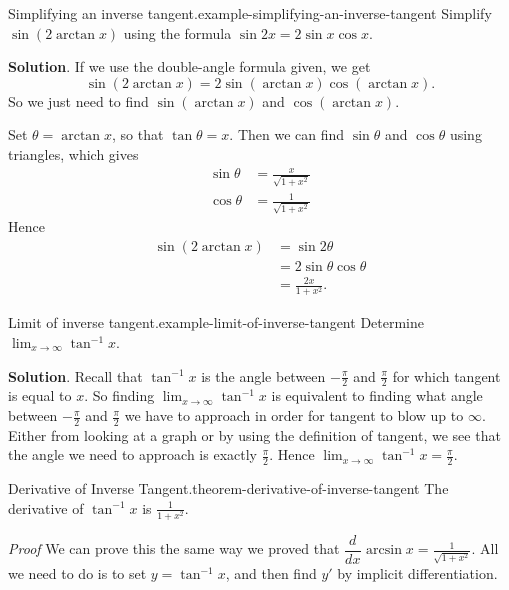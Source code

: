 \documentclass[10pt,]{book}
\makeatletter
\renewcommand*{\proofname}{Proof}
\renewenvironment{proof}[1][\proofname]{\par
  \pushQED{\qed}%
  \normalfont \topsep6\p@\@plus6\p@\relax
  \trivlist
  \item\relax
    {\itshape
    #1\@addpunct{.}}\hspace\labelsep\ignorespaces
}{%
  \popQED\endtrivlist\@endpefalse
}
\numberwithin{equation}{section}
\newcommand{\dv}[3][]{\dfrac{d^{#1} #2}{d #3^{#1}}}
\makeatother
\begin{document}
\begin{example}{Simplifying an inverse tangent.}{example-simplifying-an-inverse-tangent}%
\hypertarget{p-273}{}%
Simplify \(\sin(2\arctan x)\) using the formula \(\sin2x = 2\sin x\cos x\).%
\par\smallskip%
\noindent\textbf{Solution}.\hypertarget{solution-59}{}\quad%
\hypertarget{p-274}{}%
If we use the double-angle formula given, we get%
\begin{equation*}
\sin(2\arctan x) = 2\sin(\arctan x)\cos(\arctan x).
\end{equation*}
So we just need to find \(\sin(\arctan x)\) and \(\cos(\arctan x)\).%
\par
\hypertarget{p-275}{}%
Set \(\theta = \arctan x\), so that \(\tan\theta = x\). Then we can find \(\sin\theta\) and \(\cos\theta\) using triangles, which gives%
\begin{align*}
\sin\theta & = \frac{x}{\sqrt{1+x^{2}}} \\
\cos\theta & = \frac{1}{\sqrt{1+x^{2}}} 
\end{align*}
Hence%
\begin{align*}
\sin(2\arctan x) & = \sin2\theta \\
& = 2\sin\theta\cos\theta \\
& = \frac{2x}{1+x^{2}}. 
\end{align*}
%
\end{example}
\begin{example}{Limit of inverse tangent.}{example-limit-of-inverse-tangent}%
\hypertarget{p-276}{}%
Determine \(\lim_{x\to\infty}\tan^{-1}x\).%
\par\smallskip%
\noindent\textbf{Solution}.\hypertarget{solution-60}{}\quad%
\hypertarget{p-277}{}%
Recall that \(\tan^{-1}x\) is the angle between \(-\frac{\pi}{2}\) and \(\frac{\pi}{2}\) for which tangent is equal to \(x\). So finding \(\lim_{x\to\infty}\tan^{-1}x\) is equivalent to finding what angle between \(-\frac{\pi}{2}\) and \(\frac{\pi}{2}\) we have to approach in order for tangent to blow up to \(\infty\). Either from looking at a graph or by using the definition of tangent, we see that the angle we need to approach is exactly \(\frac{\pi}{2}\). Hence \(\lim_{x\to\infty}\tan^{-1}x = \frac{\pi}{2}\).%
\end{example}
\begin{theorem}{Derivative of Inverse Tangent.}{}{theorem-derivative-of-inverse-tangent}%
\hypertarget{p-278}{}%
The derivative of \(\tan^{-1}x\) is \(\frac{1}{1+x^{2}}\).%
\end{theorem}
\begin{proof}\hypertarget{proof-7}{}
\hypertarget{p-279}{}%
We can prove this the same way we proved that \(\dv{}{x}\arcsin x = \frac{1}{\sqrt{1+x^{2}}}\). All we need to do is to set \(y = \tan^{-1}x\), and then find \(y'\) by implicit differentiation.%
\end{proof}
\end{document}
